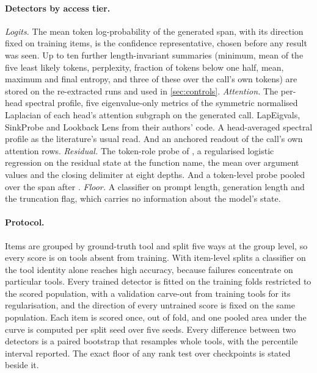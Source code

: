 \begin{table}[t]
\centering
\small
\caption{The model set. \emph{Reasoning mode} records whether the chat template carries a thinking mode, which is disabled at generation throughout. The column is discussed in \cref{sec:discussion}.}
\label{tab:models}

\end{table}

\paragraph{Detectors by access tier.}
\emph{Logits.} The mean token log-probability of the generated span, with its direction fixed on training items, is the confidence representative, chosen before any result was seen. Up to ten further length-invariant summaries (minimum, mean of the five least likely tokens, perplexity, fraction of tokens below one half, mean, maximum and final entropy, and three of these over the call's own tokens) are stored on the re-extracted runs and used in \cref{sec:controls}. \emph{Attention.} The per-head spectral profile, five eigenvalue-only metrics of the symmetric normalised Laplacian of each head's attention subgraph on the generated call. LapEigvals, SinkProbe and Lookback Lens from their authors' code. A head-averaged spectral profile as the literature's usual read. And an anchored readout of the call's own attention rows. \emph{Residual.} The token-role probe of \citet{healy2026internal}, a regularised logistic regression on the residual state at the function name, the mean over argument values and the closing delimiter at eight depths. And a token-level probe pooled over the span after \citet{obeso2025realtime}. \emph{Floor.} A classifier on prompt length, generation length and the truncation flag, which carries no information about the model's state.

\paragraph{Protocol.}
Items are grouped by ground-truth tool and split five ways at the group level, so every score is on tools absent from training. With item-level splits a classifier on the tool identity alone reaches high accuracy, because failures concentrate on particular tools. Every trained detector is fitted on the training folds restricted to the scored population, with a validation carve-out from training tools for its regularisation, and the direction of every untrained score is fixed on the same population. Each item is scored once, out of fold, and one pooled area under the curve is computed per split seed over five seeds. Every difference between two detectors is a paired bootstrap that resamples whole tools, with the percentile interval reported. The exact floor of any rank test over checkpoints is stated beside it.

